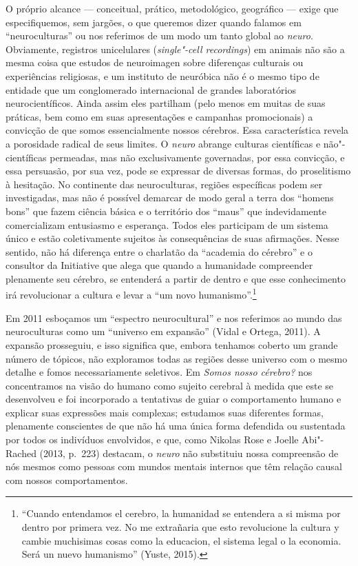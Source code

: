 O próprio alcance --- conceitual, prático, metodológico, geográfico ---
exige que especifiquemos, sem jargões, o que queremos dizer quando
falamos em ``neuroculturas'' ou nos referimos de um modo um tanto global
ao \emph{neuro}. Obviamente, registros unicelulares (\emph{single"-cell
recordings}) em animais não são a mesma coisa que estudos de neuroimagen
sobre diferenças culturais ou experiências religiosas, e um instituto de
neuróbica não é o mesmo tipo de entidade que um conglomerado
internacional de grandes laboratórios neurocientíficos. Ainda assim eles
partilham (pelo menos em muitas de suas práticas, bem como em suas
apresentações e campanhas promocionais) a convicção de que somos
essencialmente nossos cérebros. Essa característica revela a
porosidade radical de seus limites. O \emph{neuro} abrange culturas científicas
e não"-científicas permeadas, mas não exclusivamente governadas, por essa
convicção, e essa persuasão, por sua vez, pode se expressar de diversas
formas, do proselitismo à hesitação. No continente das neuroculturas,
regiões específicas podem ser investigadas, mas não é possível demarcar
de modo geral a terra dos ``homens bons'' que fazem ciência básica e o
território dos ``maus'' que indevidamente comercializam entusiasmo e
esperança. Todos eles participam de um sistema único e estão
coletivamente sujeitos às consequências de suas afirmações. Nesse
sentido, não há diferença entre o charlatão da ``academia do cérebro'' e
o consultor da  Initiative que alega que quando a humanidade
compreender plenamente seu cérebro, se entenderá a partir de dentro e
que esse conhecimento irá revolucionar a cultura e levar a ``um novo
humanismo''.\footnote[7]{``Cuando entendamos el cerebro, la humanidad se entendera a si misma
por dentro por primera vez. No me extrañaria que esto revolucione la
cultura y cambie muchisimas cosas como la educacion, el sistema legal o
la economia. Será un nuevo humanismo'' (Yuste, 2015).}

Em 2011 esboçamos um ``espectro neurocultural'' e nos referimos ao mundo
das neuroculturas como um ``universo em expansão'' (Vidal e Ortega,
2011). A expansão prosseguiu, e isso significa que, embora tenhamos
coberto um grande número de tópicos, não exploramos todas as regiões
desse universo com o mesmo detalhe e fomos necessariamente seletivos. Em
\emph{Somos nosso cérebro?} nos concentramos na visão do humano como
sujeito cerebral à medida que este se desenvolveu e foi incorporado a
tentativas de guiar o comportamento humano e explicar suas expressões
mais complexas; estudamos suas diferentes formas, plenamente conscientes
de que não há uma única forma defendida ou sustentada por todos os
indivíduos envolvidos, e que, como Nikolas Rose e Joelle Abi"-Rached
(2013, p.~223) destacam, o \emph{neuro} não substituiu nossa compreensão
de nós mesmos como pessoas com mundos mentais internos que têm relação
causal com nossos comportamentos.

